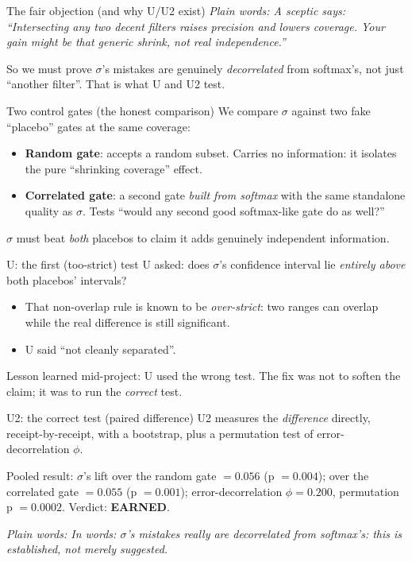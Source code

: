 \documentclass[aspectratio=169]{beamer}
\newcommand{\orthEarned}{EARNED}
\newcommand{\orthDrand}{0.056}
\newcommand{\orthDrandP}{0.004}
\newcommand{\orthDcorr}{0.055}
\newcommand{\orthDcorrP}{0.001}
\newcommand{\orthPhi}{0.200}
\newcommand{\orthPhiP}{0.0002}
\newcommand{\keybox}[1]{\begin{center}\colorbox{grey!15}{\parbox{0.92\linewidth}{\centering #1}}\end{center}}
\newcommand{\plain}[1]{\textit{\textcolor{sig}{Plain words:} #1}}
\begin{document}
\begin{frame}{The fair objection (and why U/U2 exist)}
\plain{A sceptic says: ``Intersecting \emph{any} two decent filters
raises precision and lowers coverage. Your gain might be that generic
shrink, not real independence.''}
\vspace{1em}
\keybox{So we must prove $\sigma$'s mistakes are genuinely
\emph{decorrelated} from softmax's, not just ``another filter''.
That is what U and U2 test.}
\end{frame}

\begin{frame}{Two control gates (the honest comparison)}
We compare $\sigma$ against two fake ``placebo'' gates at the same
coverage:
\begin{itemize}
\item \textbf{Random gate}: accepts a random subset. Carries no
information: it isolates the pure ``shrinking coverage'' effect.
\item \textbf{Correlated gate}: a second gate \emph{built from
softmax} with the same standalone quality as $\sigma$. Tests ``would
any second good softmax-like gate do as well?''
\end{itemize}
\keybox{$\sigma$ must beat \emph{both} placebos to claim it adds
genuinely independent information.}
\end{frame}

\begin{frame}{U: the first (too-strict) test}
U asked: does $\sigma$'s confidence interval lie \emph{entirely
above} both placebos' intervals?
\begin{itemize}
\item That non-overlap rule is known to be \emph{over-strict}: two
ranges can overlap while the real difference is still significant.
\item U said ``not cleanly separated''.
\end{itemize}
\keybox{Lesson learned mid-project: U used the wrong test. The fix was
not to soften the claim; it was to run the \emph{correct} test.}
\end{frame}

\begin{frame}{U2: the correct test (paired difference)}
U2 measures the \emph{difference} directly, receipt-by-receipt, with a
bootstrap, plus a permutation test of error-decorrelation $\phi$.
\vspace{0.6em}
\keybox{Pooled result: $\sigma$'s lift over the random gate
$=\orthDrand$ (p $=\orthDrandP$); over the correlated gate
$=\orthDcorr$ (p $=\orthDcorrP$); error-decorrelation
$\phi=\orthPhi$, permutation p $=\orthPhiP$. Verdict:
\textcolor{ok}{\textbf{\orthEarned}}.}
\vspace{0.4em}
\plain{In words: $\sigma$'s mistakes really are decorrelated from
softmax's: this is established, not merely suggested.}
\end{frame}
\end{document}
